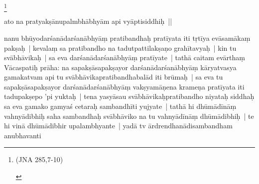 \documentclass[article,12pt,a4paper]{memoir}%
\newcounter{parCount}
\begin{document}
	  
	  \footnote{\begin{english}(JNA 285,7-10)\end{english}}

	  \pstart \leavevmode%
	ato na pratyakṣānupalmbhābhyām api vyāptisiddhiḥ ||
	{}
	\pend%
      
	  
	

	  \pstart \leavevmode%
	\label{thakur75-45.30}nanu bhūyodarśanādarśanābhyāṃ pratibandhaḥ pratīyata iti tṛtīya evāsamākaṃ pakṣaḥ | kevalaṃ sa pratibandho na tadutpattilakṣaṇo grahītavyaḥ | kin tu svābhāvikaḥ | sa eva darśanādarśanābhyāṃ pratīyate | tathā caitam evārthaṃ Vācaspatiḥ prāha: na sapakṣāsapakṣayor \label{ratnakīrtinibandhāvali__36r1PF7IMVS4B46SOBOG8KXEGK8}darśanādarśanābhyāṃ\label{ratnakīrtinibandhāvali__36r1PF7IMVRB34ML6ZYATM1PHF2} kāryatvasya gamakatvam api tu svābhāvikapratibandhabalād iti brūmaḥ | sa eva tu sapakṣāsapakṣayor darśanādarśanābhyāṃ vakṣyamāṇena krameṇa pratīyata iti tadupakṣepo 'pi yuktaḥ | \label{sarit__ratnakīrtinibandhāvali__122689}tena yasyāsau \label{ratnakīrtinibandhāvali__36r1PF7IMVQJ1KWGQSXO9UY1JGL}svābhāvikaḥ\label{ratnakīrtinibandhāvali__36r1PF7IMVPPPG3TFIIZHIM3XZ4}pratibandho niyataḥ siddhaḥ sa eva gamako gamyaś cetaraḥ sambandhīti yujyate | tathā hi dhūmādīnāṃ vahnyādibhiḥ saha sambandhaḥ svābhāviko na tu vahnyādīnāṃ dhūmādibhiḥ | te hi vinā dhūmādibhir upalambhyante | yadā tv \label{ratnakīrtinibandhāvali__36r1PF7IMVOXKCE0O54J1VV68NX}ārdrendhanādisambandham\label{ratnakīrtinibandhāvali__36r1PF7IMVO3DAEZ0FQPWRJZXZ2} anubhavanti 
\end{document}
